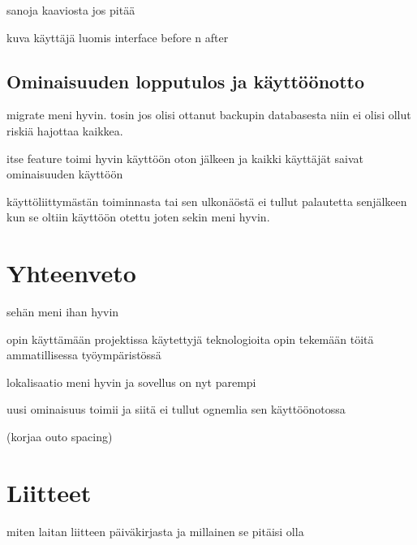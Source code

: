 \documentclass[11pt,a4paper,titlepage,oneside]{article}
\begin{document}
sanoja kaaviosta jos pitää
\bigskip

kuva käyttäjä luomis interface before n after
\medskip




\subsection{Ominaisuuden lopputulos ja käyttöönotto}


migrate meni hyvin. tosin jos olisi ottanut backupin databasesta niin ei olisi ollut riskiä hajottaa kaikkea.
\medskip

itse feature toimi hyvin käyttöön oton jälkeen ja kaikki käyttäjät saivat ominaisuuden käyttöön
\medskip

käyttöliittymästän toiminnasta tai sen ulkonäöstä ei tullut palautetta senjälkeen kun se oltiin käyttöön otettu joten sekin meni hyvin.
\medskip












\newpage
\section{Yhteenveto}

sehän meni ihan hyvin 

opin käyttämään projektissa käytettyjä teknologioita
opin tekemään töitä ammatillisessa työympäristössä
\medskip


lokalisaatio meni hyvin ja sovellus on nyt parempi
\medskip


uusi ominaisuus toimii ja siitä ei tullut ognemlia sen käyttöönotossa
\medskip





\newpage




(korjaa outo spacing)








\section{Liitteet}               %

miten laitan liitteen päiväkirjasta ja millainen se pitäisi olla
\end{document}

